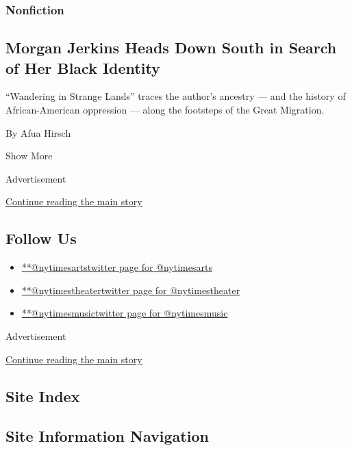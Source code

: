 \begin{enumerate}
  \hypertarget{nonfiction-1}{%
  \subsubsection{Nonfiction}\label{nonfiction-1}}

  \hypertarget{morgan-jerkins-heads-down-south-in-search-of-her-black-identity}{%
  \subsection{Morgan Jerkins Heads Down South in Search of Her Black
  Identity}\label{morgan-jerkins-heads-down-south-in-search-of-her-black-identity}}

  ``Wandering in Strange Lands'' traces the author's ancestry --- and
  the history of African-American oppression --- along the footsteps of
  the Great Migration.

  By Afua Hirsch
\end{enumerate}

Show More

Advertisement

\protect\hyperlink{after-mid2}{Continue reading the main story}

\hypertarget{follow-us}{%
\subsection{Follow Us}\label{follow-us}}

\begin{itemize}
\tightlist
\item
  \href{https://twitter.com/nytimesarts}{**@nytimesartstwitter page for
  @nytimesarts}
\item
  \href{https://twitter.com/nytimestheater}{**@nytimestheatertwitter
  page for @nytimestheater}
\item
  \href{https://twitter.com/nytimesmusic}{**@nytimesmusictwitter page
  for @nytimesmusic}
\end{itemize}

Advertisement

\protect\hyperlink{after-mktg}{Continue reading the main story}

\hypertarget{site-index}{%
\subsection{Site Index}\label{site-index}}

\hypertarget{site-information-navigation}{%
\subsection{Site Information
Navigation}\label{site-information-navigation}}

